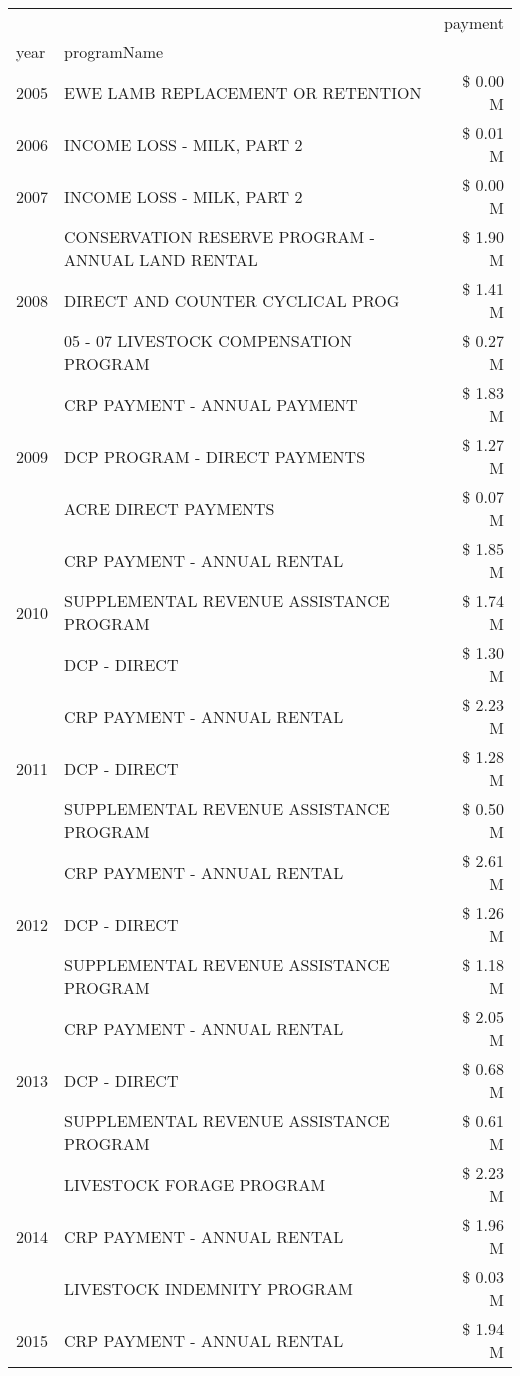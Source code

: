 \begin{tabular}{llr}
\toprule
 &  & payment \\
year & programName &  \\
\midrule
2005 & EWE LAMB REPLACEMENT OR RETENTION & \$ 0.00 M \\
\cline{1-3}
2006 & INCOME LOSS - MILK, PART 2 & \$ 0.01 M \\
\cline{1-3}
2007 & INCOME LOSS - MILK, PART 2 & \$ 0.00 M \\
\cline{1-3}
\multirow[t]{3}{*}{2008} & CONSERVATION RESERVE PROGRAM - ANNUAL LAND RENTAL & \$ 1.90 M \\
 & DIRECT AND COUNTER CYCLICAL PROG & \$ 1.41 M \\
 & 05 - 07 LIVESTOCK COMPENSATION PROGRAM & \$ 0.27 M \\
\cline{1-3}
\multirow[t]{3}{*}{2009} & CRP PAYMENT - ANNUAL PAYMENT & \$ 1.83 M \\
 & DCP PROGRAM - DIRECT PAYMENTS & \$ 1.27 M \\
 & ACRE DIRECT PAYMENTS & \$ 0.07 M \\
\cline{1-3}
\multirow[t]{3}{*}{2010} & CRP PAYMENT - ANNUAL RENTAL & \$ 1.85 M \\
 & SUPPLEMENTAL REVENUE ASSISTANCE PROGRAM & \$ 1.74 M \\
 & DCP - DIRECT & \$ 1.30 M \\
\cline{1-3}
\multirow[t]{3}{*}{2011} & CRP PAYMENT - ANNUAL RENTAL & \$ 2.23 M \\
 & DCP - DIRECT & \$ 1.28 M \\
 & SUPPLEMENTAL REVENUE ASSISTANCE PROGRAM & \$ 0.50 M \\
\cline{1-3}
\multirow[t]{3}{*}{2012} & CRP PAYMENT - ANNUAL RENTAL & \$ 2.61 M \\
 & DCP - DIRECT & \$ 1.26 M \\
 & SUPPLEMENTAL REVENUE ASSISTANCE PROGRAM & \$ 1.18 M \\
\cline{1-3}
\multirow[t]{3}{*}{2013} & CRP PAYMENT - ANNUAL RENTAL & \$ 2.05 M \\
 & DCP - DIRECT & \$ 0.68 M \\
 & SUPPLEMENTAL REVENUE ASSISTANCE PROGRAM & \$ 0.61 M \\
\cline{1-3}
\multirow[t]{3}{*}{2014} & LIVESTOCK FORAGE PROGRAM & \$ 2.23 M \\
 & CRP PAYMENT - ANNUAL RENTAL & \$ 1.96 M \\
 & LIVESTOCK INDEMNITY PROGRAM & \$ 0.03 M \\
\cline{1-3}
\multirow[t]{3}{*}{2015} & CRP PAYMENT - ANNUAL RENTAL & \$ 1.94 M \\

\end{tabular}
